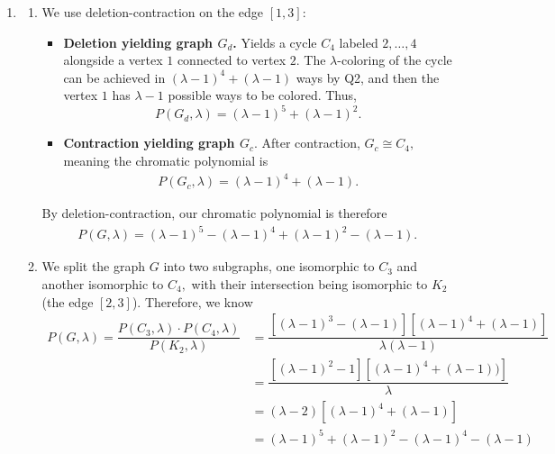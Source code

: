 \documentclass[12pt]{article}
\begin{document}
\begin{enumerate}
    Therefore, by mathematical induction $P(C_n, \lambda) =
    (\lambda-1)^n + (-1)^n(\lambda - 1)$ for all integers $n \geq 3.$

    \newpage

  \item
    \begin{enumerate}
      \item We use deletion-contraction on the edge $[1, 3]$:
        \begin{itemize}
          \item \textbf{Deletion yielding graph $G_d$.} Yields a
            cycle $C_4$ labeled $2, \ldots, 4$ alongside a vertex $1$
            connected to vertex $2.$ The $\lambda$-coloring of the
            cycle can be achieved in $(\lambda -1)^4 + (\lambda - 1)$
            ways by Q2, and then the vertex $1$ has $\lambda - 1$
            possible ways to be colored. Thus, $$P(G_d, \lambda ) =
            (\lambda-1)^5 + (\lambda - 1)^2.$$

          \item \textbf{Contraction yielding graph $G_c.$} After
            contraction, $G_c \cong C_4,$ meaning the chromatic polynomial is
            \begin{align*}
              P(G_c, \lambda) = (\lambda-1)^4 + (\lambda - 1).
            \end{align*}
        \end{itemize}

        By deletion-contraction, our chromatic polynomial is therefore
        \begin{align*}
          P(G, \lambda) = (\lambda - 1)^5 - (\lambda - 1)^4 +
          (\lambda - 1)^2 - (\lambda - 1).
        \end{align*}

      \item We split the graph $G$ into two subgraphs, one isomorphic
        to $C_3$ and another isomorphic to $C_4,$ with their
        intersection being isomorphic to $K_2$ (the edge $[2, 3]$).
        Therefore, we know
        \begin{align*}
          P(G, \lambda) = \dfrac{P(C_3, \lambda) \cdot P(C_4,
          \lambda)}{P(K_2, \lambda)} &= \dfrac{[(\lambda -1)^3 -
            (\lambda - 1)][(\lambda - 1)^4 + (\lambda -
          1)]}{\lambda(\lambda - 1)} \\
          &= \dfrac{[(\lambda - 1)^2 -1 ][(\lambda -1)^4 + (\lambda -
        1))]}{\lambda} \\
        &= (\lambda - 2)[(\lambda -1)^4 + (\lambda - 1)] \\
        &= (\lambda -1)^5 + (\lambda - 1)^2 - (\lambda -1)^4 - (\lambda - 1)
      \end{align*}


\end{enumerate}
\end{enumerate}
\end{document}
